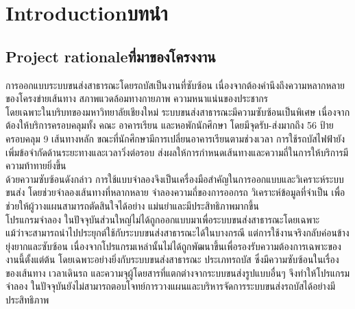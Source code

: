 \chapter{\ifenglish Introduction\else บทนำ\fi}

\newenvironment{mypara}{\par\setlength{\parindent}{1em}\indent}{}


\setlength{\parindent}{2em}

\section{\ifenglish Project rationale\else ที่มาของโครงงาน\fi}
\begin{mypara}
    \indent การออกแบบระบบขนส่งสาธารณะโดยรถบัสเป็นงานที่ซับซ้อน เนื่องจากต้องคำนึงถึงความหลากหลายของโครงข่ายเส้นทาง 
    สภาพแวดล้อมทางกายภาพ ความหนาแน่นของประชากร \\ 
    \indent โดยเฉพาะในบริบทของมหาวิทยาลัยเชียงใหม่ ระบบขนส่งสาธารณะมีความซับซ้อนเป็นพิเศษ 
    เนื่องจากต้องให้บริการครอบคลุมทั้ง คณะ อาคารเรียน และหอพักนักศึกษา โดยมีจุดรับ-ส่งมากถึง 56 ป้าย ครอบคลุม 9 เส้นทางหลัก 
    ขณะที่นักศึกษามีการเปลี่ยนอาคารเรียนตามช่วงเวลา การใช้รถบัสไฟฟ้ายังเพิ่มข้อจำกัดด้านระยะทางและเวลาวิ่งต่อรอบ 
    ส่งผลให้การกำหนดเส้นทางและความถี่ในการให้บริการมีความท้าทายยิ่งขึ้น \\
    \indent ด้วยความซับซ้อนดังกล่าว การใช้แบบจำลองจึงเป็นเครื่องมือสำคัญในการออกแบบและวิเคราะห์ระบบขนส่ง 
    โดยช่วยจำลองเส้นทางที่หลากหลาย จำลองความถี่ของการออกรถ วิเคราะห์ข้อมูลที่จำเป็น เพื่อช่วยให้ผู้วางแผนสามารถตัดสินใจได้อย่าง
    แม่นยำและมีประสิทธิภาพมากขึ้น  \\
    \indent โปรแกรมจำลอง ในปัจจุบันส่วนใหญ่ไม่ได้ถูกออกแบบมาเพื่อระบบขนส่งสาธารณะโดยเฉพาะ \\
    แม้ว่าจะสามารถนำไปประยุกต์ใช้กับระบบขนส่งสาธารณะได้ในบางกรณี แต่การใช้งานจริงกลับค่อนข้างยุ่งยากและซับซ้อน 
    เนื่องจากโปรแกรมเหล่านั้นไม่ได้ถูกพัฒนาขึ้นเพื่อรองรับความต้องการเฉพาะของงานนี้ตั้งแต่ต้น โดยเฉพาะอย่างยิ่งกับระบบขนส่งสาธารณะ
    ประเภทรถบัส ซึ่งมีความซับซ้อนในเรื่องของเส้นทาง เวลาเดินรถ และความจุผู้โดยสารที่แตกต่างจากระบบขนส่งรูปแบบอื่นๆ 
    จึงทำให้โปรแกรมจำลอง ในปัจจุบันยังไม่สามารถตอบโจทย์การวางแผนและบริหารจัดการระบบขนส่งรถบัสได้อย่างมีประสิทธิภาพ
\end{mypara}

